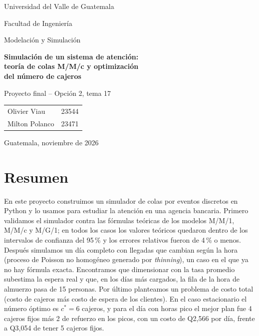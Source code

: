 \documentclass[11pt,letterpaper]{article}
\begin{document}
\begin{titlepage}
\centering
{\large Universidad del Valle de Guatemala\par}
{\large Facultad de Ingeniería\par}
{\large Modelación y Simulación\par}
\vspace{4cm}
{\LARGE\bfseries Simulación de un sistema de atención:\\[0.3cm]
teoría de colas M/M/c y optimización\\[0.3cm] del número de cajeros\par}
\vspace{1cm}
{\large Proyecto final -- Opción 2, tema 17\par}
\vspace{4cm}
{\large
\begin{tabular}{ll}
Olivier Viau & 23544 \\
Milton Polanco & 23471 \\
\end{tabular}\par}
\vfill
{\large Guatemala, noviembre de 2026\par}
\end{titlepage}

\section*{Resumen}
En este proyecto construimos un simulador de colas por eventos discretos en Python y lo
usamos para estudiar la atención en una agencia bancaria. Primero validamos el simulador
contra las fórmulas teóricas de los modelos M/M/1, M/M/c y M/G/1; en todos los casos los
valores teóricos quedaron dentro de los intervalos de confianza del 95\,\% y los errores
relativos fueron de 4\,\% o menos. Después simulamos un día completo con llegadas que
cambian según la hora (proceso de Poisson no homogéneo generado por \emph{thinning}),
un caso en el que ya no hay fórmula exacta. Encontramos que dimensionar con la tasa
promedio subestima la espera real y que, en los días más cargados, la fila de la hora de
almuerzo pasa de 15 personas. Por último planteamos un problema de costo total (costo de cajeros más costo
de espera de los clientes). En el caso estacionario el número óptimo es $c^*=6$ cajeros, y
para el día con horas pico el mejor plan fue 4 cajeros fijos más 2 de refuerzo en los
picos, con un costo de Q2,566 por día, frente a Q3,054 de tener 5 cajeros fijos.
\end{document}

